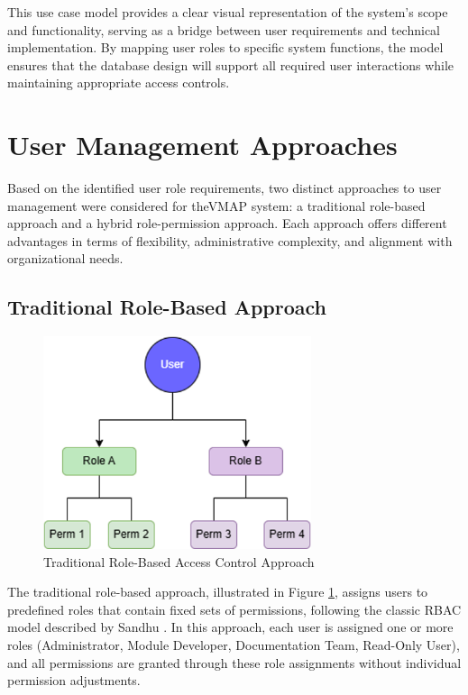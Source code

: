 This use case model provides a clear visual representation of the system's scope and functionality, serving as a bridge between user requirements and technical implementation. By mapping user roles to specific system functions, the model ensures that the database design will support all required user interactions while maintaining appropriate access controls.

\section{User Management Approaches}
\label{sec:user-management-approaches}

Based on the identified user role requirements, two distinct approaches to user management were considered for the\ac{VMAP} system: a traditional role-based approach and a hybrid role-permission approach. Each approach offers different advantages in terms of flexibility, administrative complexity, and alignment with organizational needs.

\subsection{Traditional Role-Based Approach}
\label{subsec:traditional-role-approach}

\begin{figure}[h]
    \centering
    \includegraphics[width=0.7\textwidth]{figures/traditional_rbac_model.png}
    \caption{Traditional Role-Based Access Control Approach}
    \label{fig:traditional-rbac}
\end{figure}

The traditional role-based approach, illustrated in Figure \ref{fig:traditional-rbac}, assigns users to predefined roles that contain fixed sets of permissions, following the classic \ac{RBAC} model described by Sandhu \cite{sandhu1998role}. In this approach, each user is assigned one or more roles (Administrator, Module Developer, Documentation Team, Read-Only User), and all permissions are granted through these role assignments without individual permission adjustments.

